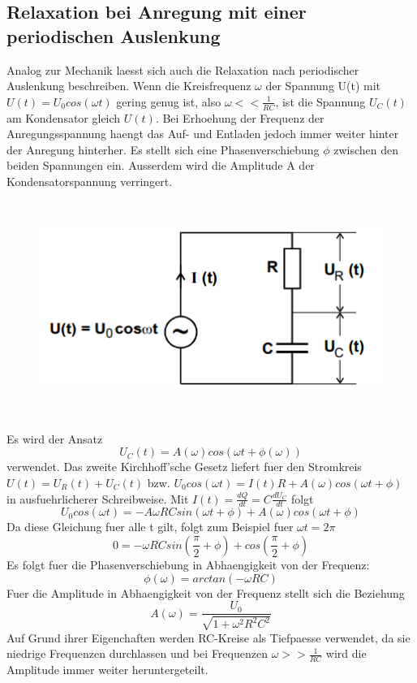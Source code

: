 \subsection{Relaxation bei Anregung mit einer periodischen Auslenkung}
Analog zur Mechanik laesst sich auch die Relaxation nach periodischer Auslenkung beschreiben. Wenn die Kreisfrequenz $\omega$ der Spannung U(t) mit $U(t)=U_0cos(\omega t)$ gering genug ist, also $\omega <<\frac{1}{RC}$, ist die Spannung $U_C(t)$ am Kondensator gleich $U(t)$. Bei Erhoehung der Frequenz der Anregungsspannung haengt das Auf- und Entladen jedoch immer weiter hinter der Anregung hinterher. Es stellt sich eine Phasenverschiebung $\phi$ zwischen den beiden Spannungen ein. Ausserdem wird die Amplitude A der Kondensatorspannung verringert. 
\begin{figure}[H]
    \centering
    \captionsetup{justification=centering}
    \includegraphics[height=7cm]{"Wechsel_RCKreis.png"}
    \label{Fig:Wechsel}
\end{figure}
Es wird der Ansatz 
\begin{equation}
    U_C(t)=A(\omega)cos(\omega t+\phi(\omega))
\end{equation}
verwendet. Das zweite Kirchhoff'sche Gesetz liefert fuer den Stromkreis $U(t)=U_R(t)+U_C(t)$ bzw. $U_0cos(\omega t)=I(t)R+A(\omega)cos(\omega t+\phi)$ in ausfuehrlicherer Schreibweise. Mit $I(t)=\frac{dQ}{dt}=C\frac{dU_C}{dt}$ folgt 
\begin{equation}
    U_0cos(\omega t)=-A\omega RCsin(\omega t+\phi)+A(\omega)cos(\omega t+\phi)
\end{equation}
Da diese Gleichung fuer alle t gilt, folgt zum Beispiel fuer $\omega t=2\pi$
\begin{equation}
    0=-\omega RCsin(\frac{\pi}{2}+\phi)+cos(\frac{\pi}{2}+\phi)
\end{equation}
Es folgt fuer die Phasenverschiebung in Abhaengigkeit von der Frequenz:
\begin{equation}
    \phi(\omega)=arctan(-\omega RC)
\end{equation}
Fuer die Amplitude in Abhaengigkeit von der Frequenz stellt sich die Beziehung
\begin{equation}
    A(\omega)=\frac{U_0}{\sqrt{1+\omega^2R^2C^2}}
\end{equation}
Auf Grund ihrer Eigenchaften werden RC-Kreise als Tiefpaesse verwendet, da sie niedrige Frequenzen durchlassen und bei Frequenzen $\omega>>\frac{1}{RC}$ wird die Amplitude immer weiter heruntergeteilt. 
